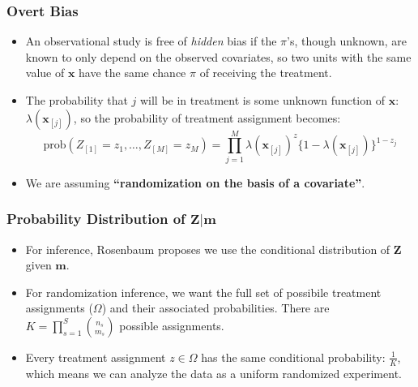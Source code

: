 \documentclass{beamer}
\begin{document}
\begin{frame}
  \frametitle{Overt Bias}
  \begin{itemize}
  \item<+-> An observational study is free of \textit{hidden} bias if the
    $\pi$'s, though unknown, are known to only depend on the observed
    covariates, so two units with the same value of $\mathbf{x}$ have
    the same chance $\pi$ of receiving the treatment. 
\item<+-> The probability that $j$ will be in treatment is some unknown
  function of $\mathbf{x}$:  $\lambda(\mathbf{x}_{[j]})$, so the
  probability of treatment assignment becomes:
\[
\textrm{prob}(Z_{[1]}=z_1,\dots, Z_{[M]} =z_M) = \prod_{j=1}^M \lambda(\mathbf{x}_{[j]})^z\{1-\lambda(\mathbf{x}_{[j]})\}^{1-z_j}
\]
\item We are assuming \textbf{``randomization on the basis of a covariate''}.
  \end{itemize}
\end{frame}



\begin{frame}
  \frametitle{Probability Distribution of $\mathbf{Z}|\mathbf{m}$}
\begin{itemize}
\item<+-> For inference, Rosenbaum proposes we use the conditional
  distribution of $\mathbf{Z}$ given $\mathbf{m}$.
\item<+-> For randomization inference, we want the full set of possibile
  treatment assignments ($\Omega$) and their associated
  probabilities. There are  $K=\prod_{s=1}^{S} \binom{n_s}{m_s}$
  possible assignments. 
\item<+-> Every treatment assignment $z \in \Omega$ has the
  same conditional probability: $\frac{1}{K}$, which means we can
  analyze the data as a uniform randomized experiment. 
\end{itemize}
\end{frame}
\end{document}
